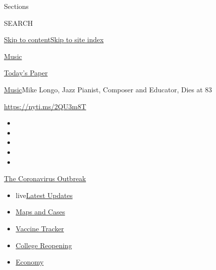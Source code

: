 Sections

SEARCH

\protect\hyperlink{site-content}{Skip to
content}\protect\hyperlink{site-index}{Skip to site index}

\href{https://www.nytimes.com/section/arts/music}{Music}

\href{https://myaccount.nytimes.com/auth/login?response_type=cookie\&client_id=vi}{}

\href{https://www.nytimes.com/section/todayspaper}{Today's Paper}

\href{/section/arts/music}{Music}\textbar{}Mike Longo, Jazz Pianist,
Composer and Educator, Dies at 83

\url{https://nyti.ms/2QU3m8T}

\begin{itemize}
\item
\item
\item
\item
\item
\end{itemize}

\href{https://www.nytimes.com/news-event/coronavirus?action=click\&pgtype=Article\&state=default\&region=TOP_BANNER\&context=storylines_menu}{The
Coronavirus Outbreak}

\begin{itemize}
\tightlist
\item
  live\href{https://www.nytimes.com/2020/08/03/world/coronavirus-covid-19.html?action=click\&pgtype=Article\&state=default\&region=TOP_BANNER\&context=storylines_menu}{Latest
  Updates}
\item
  \href{https://www.nytimes.com/interactive/2020/us/coronavirus-us-cases.html?action=click\&pgtype=Article\&state=default\&region=TOP_BANNER\&context=storylines_menu}{Maps
  and Cases}
\item
  \href{https://www.nytimes.com/interactive/2020/science/coronavirus-vaccine-tracker.html?action=click\&pgtype=Article\&state=default\&region=TOP_BANNER\&context=storylines_menu}{Vaccine
  Tracker}
\item
  \href{https://www.nytimes.com/2020/08/02/us/covid-college-reopening.html?action=click\&pgtype=Article\&state=default\&region=TOP_BANNER\&context=storylines_menu}{College
  Reopening}
\item
  \href{https://www.nytimes.com/live/2020/08/03/business/stock-market-today-coronavirus?action=click\&pgtype=Article\&state=default\&region=TOP_BANNER\&context=storylines_menu}{Economy}
\end{itemize}


